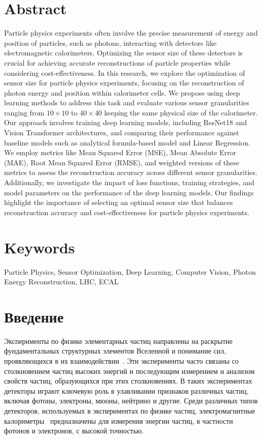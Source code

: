 \documentclass[a4paper,12pt]{extarticle}
\begin{document}
\section*{Abstract}   %
Particle physics experiments often involve the precise measurement of energy and position of particles, such as photons, interacting with detectors like electromagnetic calorimeters. Optimizing the sensor size of these detectors is crucial for achieving accurate reconstructions of particle properties while considering cost-effectiveness. In this research, we explore the optimization of sensor size for particle physics experiments, focusing on the reconstruction of photon energy and position within calorimeter cells. We propose using deep learning methods to address this task and evaluate various sensor granularities ranging from $10 \times 10$ to $40 \times 40$ keeping the same physical size of the calorimeter. Our approach involves training deep learning models, including ResNet18 and Vision Transformer architectures, and comparing their performance against baseline models such as analytical formula-based model and Linear Regression. We employ metrics like Mean Squared Error (MSE), Mean Absolute Error (MAE), Root Mean Squared Error (RMSE), and weighted versions of these metrics to assess the reconstruction accuracy across different sensor granularities. Additionally, we investigate the impact of loss functions, training strategies, and model parameters on the performance of the deep learning models. Our findings highlight the importance of selecting an optimal sensor size that balances reconstruction accuracy and cost-effectiveness for particle physics experiments.


\section*{Keywords}
Particle Physics, Sensor Optimization, Deep Learning, Computer Vision, Photon Energy Reconstruction, LHC, ECAL

\pagebreak

\section{Введение}
\label{section:introduction}

Эксперименты по физике элементарных частиц направлены на раскрытие фундаментальных структурных элементов Вселенной и понимание сил, проявляющихся в их взаимодействии~\cite{Griffiths:1987tj}. Эти эксперименты часто связаны со столкновением частиц высоких энергий и последующим измерением и анализом свойств частиц, образующихся при этих столкновениях. В таких экспериментах детекторы играют ключевую роль в улавливании признаков различных частиц, включая фотоны, электроны, мюоны, нейтрино и другие. Среди различных типов детекторов, используемых в экспериментах по физике частиц, электромагнитные калориметры~\cite{LHCb:2008vvz} предназначены для измерения энергии частиц, в частности фотонов и электронов, с высокой точностью.
\end{document}
